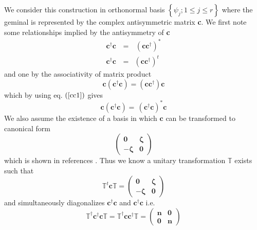 \documentclass{article}
\begin{document}
We consider this construction in orthonormal basis $\left\{ \psi _{j};1\leq
j\leq r\right\} $ where the geminal is represented by the complex
antisymmetric matrix \textbf{c}. We first note some relationships implied by
the antisymmetry of \textbf{c}%
\begin{eqnarray}
\mathbf{c}^{\dagger }\mathbf{c\,} &=&\mathbf{\,}\left( \mathbf{cc}^{\dagger
}\right) ^{\ast }  \label{cc1} \\
\mathbf{c}^{\dagger }\mathbf{c\,} &\mathbf{=}&\left( \mathbf{cc}^{\dagger
}\right) ^{t}
\end{eqnarray}%
and one by the associativity of matrix product 
\begin{equation}
\mathbf{c}\left( \mathbf{c}^{\dagger }\mathbf{c}\right) =\left( \mathbf{cc}%
^{\dagger }\right) \mathbf{c}
\end{equation}%
which by using eq. $\left( \ref{cc1}\right) $ gives 
\begin{equation}
\mathbf{c}\left( \mathbf{c}^{\dagger }\mathbf{c}\right) =\mathbf{\,}\left( 
\mathbf{c}^{\dagger }\mathbf{c}\right) ^{\ast }\mathbf{c}  \label{cr}
\end{equation}%
We also assume the existence of a basis in which $\mathbf{c}$ can be
transformed to canonical form 
\begin{equation}
\left( 
\begin{array}{cc}
\mathbf{0} & \mathbf{\zeta } \\ 
-\mathbf{\zeta } & \mathbf{0}%
\end{array}%
\right)
\end{equation}%
which is shown in references \cite{Bloch1}\cite{Zumino1}. Thus we know a
unitary transformation $\mathbb{T}$ exists such that 
\begin{equation}
\mathbb{T}^{t}\mathbf{c}\mathbb{T=}\left( 
\begin{array}{cc}
\mathbf{0} & \mathbf{\zeta } \\ 
-\mathbf{\zeta } & \mathbf{0}%
\end{array}%
\right)
\end{equation}%
and simultaneously diagonalizes $\mathbf{c}^{\dagger }\mathbf{c}$ and $%
\mathbf{c}^{\dagger }\mathbf{c}$ i.e. 
\begin{equation}
\mathbb{T}^{\dagger }\mathbf{c}^{\dagger }\mathbf{c}\mathbb{T=T}^{\dagger }%
\mathbf{cc}^{\dagger }\mathbb{T=}\left( 
\begin{array}{cc}
\mathbf{n} & \mathbf{0} \\ 
\mathbf{0} & \mathbf{n}%
\end{array}%
\right)
\end{equation}%
\end{document}
